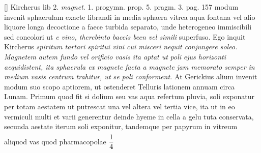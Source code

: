 \pstart 
[99 v\textsuperscript{o}] [] Kircherus\protect{} lib 2. \textit{magnet}.  1. progymn. prop. 5. pragm. 3. pag. 157  modum invenit sphaerulam exacte librandi  in media sphaera vitrea aqua fontana vel  alio liquore longa decoctione a faece turbida  separato, unde heterogeneo immiscibili sed  concolori ut \textit{e vino, therebinto baccis been vel simili} superfuso. Ego inquit Kircherus\protect{} \textit{spiritum tartari spiritui vini cui misceri nequit  conjungere soleo. }\textit{Magnetem}\protect{}\textit{ autem fundo vel  orificio vasis ita aptat ut }\textit{poli}\protect{}\textit{ ejus horizonti  aequidistent, ita sphaerula ex }\textit{magnete}\protect{}\textit{  facta a }\textit{magnete}\protect{}\textit{ jam memorato semper  in medium vasis centrum trahitur, ut se }\textit{poli}\protect{}
\textit{ conforment.} 
At Gerickius\protect{} alium  invenit modum suo scopo aptiorem, ut ostenderet Telluris\protect{} lationem annuam circa Lunam\protect{}.  Primum  quod  fit si dolium seu vas aqua refertum pluvia, soli\protect{} exponatur per totam aestatem ut putrescat  una vel altera vel tertia vice, ita ut in eo  vermiculi multi et varii generentur deinde hyeme in cella a gelu tuta conservata, secunda aestate  iterum soli\protect{} exponitur, tandemque per papyrum  in vitreum aliquod vas quod pharmacopolae $\displaystyle \frac{1}{4}\rule[-4mm]{0mm}{10mm}$%
